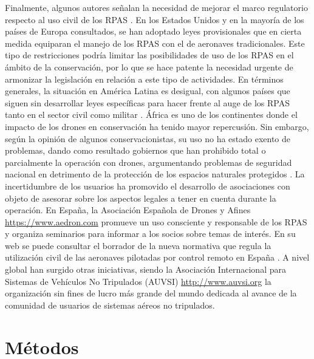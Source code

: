 \documentclass[twocolumn]{extarticle}
\begin{document}
Finalmente, algunos autores señalan la necesidad de mejorar el marco
regulatorio respecto al uso civil de los RPAS \citep{Nugraha2016}. En
los Estados Unidos y en la mayoría de los países de Europa consultados,
se han adoptado leyes provisionales que en cierta medida equiparan el
manejo de los RPAS con el de aeronaves tradicionales. Este tipo de
restricciones podría limitar las posibilidades de uso de los RPAS en el
ámbito de la conservación, por lo que se hace patente la necesidad
urgente de armonizar la legislación en relación a este tipo de
actividades. En términos generales, la situación en América Latina es
desigual, con algunos países que siguen sin desarrollar leyes
específicas para hacer frente al auge de los RPAS tanto en el sector
civil como militar \citep{Nacion2013}. África es uno de los continentes
donde el impacto de los drones en conservación ha tenido mayor
repercusión. Sin embargo, según la opinión de algunos conservacionistas,
su uso no ha estado exento de problemas, dando como resultado gobiernos
que han prohibido total o parcialmente la operación con drones,
argumentando problemas de seguridad nacional en detrimento de la
protección de los espacios naturales protegidos \citep{Andrews2014}. La
incertidumbre de los usuarios ha promovido el desarrollo de asociaciones
con objeto de asesorar sobre los aspectos legales a tener en cuenta
durante la operación. En España, la Asociación Española de Drones y
Afines \url{https://www.aedron.com} promueve un uso consciente y
responsable de los RPAS y organiza seminarios para informar a los socios
sobre temas de interés. En su web se puede consultar el borrador de la
nueva normativa que regula la utilización civil de las aeronaves
pilotadas por control remoto en España \citep{Aedron2017}. A nivel
global han surgido otras iniciativas, siendo la Asociación Internacional
para Sistemas de Vehículos No Tripulados (AUVSI)
\url{http://www.auvsi.org} la organización sin fines de lucro más grande
del mundo dedicada al avance de la comunidad de usuarios de sistemas
aéreos no tripulados.

\section{Métodos}\label{metodos}
\end{document}
